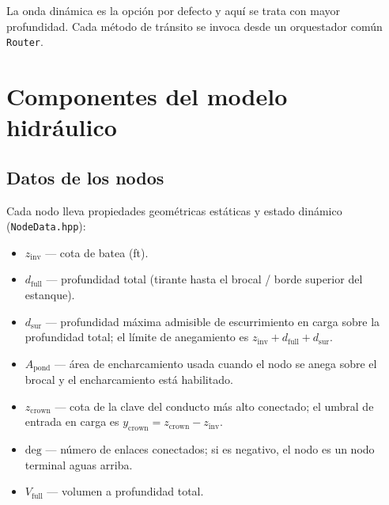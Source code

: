 \documentclass[11pt,a4paper]{article}
\begin{document}
La onda dinámica es la opción por defecto y aquí se trata con mayor profundidad.
Cada método de tránsito se invoca desde un orquestador común \texttt{Router}.

\section{Componentes del modelo hidráulico}

\subsection{Datos de los nodos}

Cada nodo lleva propiedades geométricas estáticas y estado dinámico
(\texttt{NodeData.hpp}):
\begin{itemize}[nosep]
  \item $z_{\mathrm{inv}}$ --- cota de batea (ft).
  \item $d_{\mathrm{full}}$ --- profundidad total (tirante hasta el brocal /
        borde superior del estanque).
  \item $d_{\mathrm{sur}}$ --- profundidad máxima admisible de escurrimiento
        en carga sobre la profundidad total; el límite de anegamiento es
        $z_{\mathrm{inv}} + d_{\mathrm{full}} + d_{\mathrm{sur}}$.
  \item $A_{\mathrm{pond}}$ --- área de encharcamiento usada cuando el nodo se
        anega sobre el brocal y el encharcamiento está habilitado.
  \item $z_{\mathrm{crown}}$ --- cota de la clave del conducto más alto
        conectado; el umbral de entrada en carga es $y_{\mathrm{crown}} =
        z_{\mathrm{crown}} - z_{\mathrm{inv}}$.
  \item $\mathrm{deg}$ --- número de enlaces conectados; si es negativo, el
        nodo es un nodo terminal aguas arriba.
  \item $V_{\mathrm{full}}$ --- volumen a profundidad total.
\end{itemize}
\end{document}
